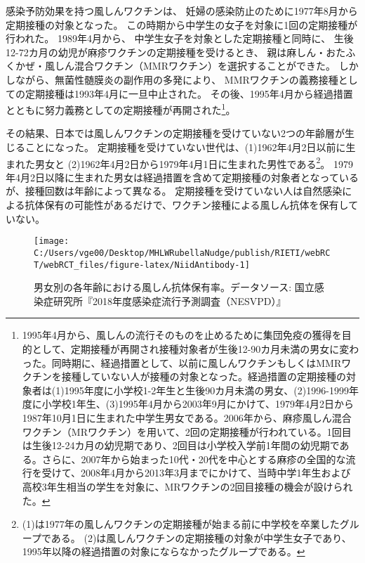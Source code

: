 \documentclass[
  11pt,
  a4paper,
]{article}
\begin{document}
感染予防効果を持つ風しんワクチンは、
妊婦の感染防止のために1977年8月から定期接種の対象となった。
この時期から中学生の女子を対象に1回の定期接種が行われた。
1989年4月から、
中学生女子を対象とした定期接種と同時に、
生後12-72カ月の幼児が麻疹ワクチンの定期接種を受けるとき、
親は麻しん・おたふくかぜ・風しん混合ワクチン（MMRワクチン）を選択することができた。
しかしながら、無菌性髄膜炎の副作用の多発により、
MMRワクチンの義務接種としての定期接種は1993年4月に一旦中止された。
その後、1995年4月から経過措置とともに努力義務としての定期接種が再開された\footnote{1995年4月から、風しんの流行そのものを止めるために集団免疫の獲得を目的として、定期接種が再開され接種対象者が生後12-90カ月未満の男女に変わった。同時期に、経過措置として、以前に風しんワクチンもしくはMMRワクチンを接種していない人が接種の対象となった。経過措置の定期接種の対象者は(1)1995年度に小学校1-2年生と生後90カ月未満の男女、(2)1996-1999年度に小学校1年生、(3)1995年4月から2003年9月にかけて、1979年4月2日から1987年10月1日に生まれた中学生男女である。2006年から、麻疹風しん混合ワクチン（MRワクチン）を用いて、2回の定期接種が行われている。1回目は生後12-24カ月の幼児期であり、2回目は小学校入学前1年間の幼児期である。さらに、2007年から始まった10代・20代を中心とする麻疹の全国的な流行を受けて、2008年4月から2013年3月までにかけて、当時中学1年生および高校3年生相当の学生を対象に、MRワクチンの2回目接種の機会が設けられた。}。

その結果、日本では風しんワクチンの定期接種を受けていない2つの年齢層が生じることになった。
定期接種を受けていない世代は、(1)1962年4月2日以前に生まれた男女と
(2)1962年4月2日から1979年4月1日に生まれた男性である\footnote{(1)は1977年の風しんワクチンの定期接種が始まる前に中学校を卒業したグループである。
  (2)は風しんワクチンの定期接種の対象が中学生女子であり、1995年以降の経過措置の対象にならなかったグループである。}。
1979年4月2日以降に生まれた男女は経過措置を含めて定期接種の対象者となっているが、接種回数は年齢によって異なる。
定期接種を受けていない人は自然感染による抗体保有の可能性があるだけで、ワクチン接種による風しん抗体を保有していない。

\begin{figure}[t]
\texttt{[image: C:/Users/vge00/Desktop/MHLWRubellaNudge/publish/RIETI/webRCT/webRCT\_files/figure-latex/NiidAntibody-1]} \caption{男女別の各年齢における風しん抗体保有率。データソース: 国立感染症研究所『2018年度感染症流行予測調査（NESVPD）』}\label{fig:NiidAntibody}
\end{figure}
\end{document}
